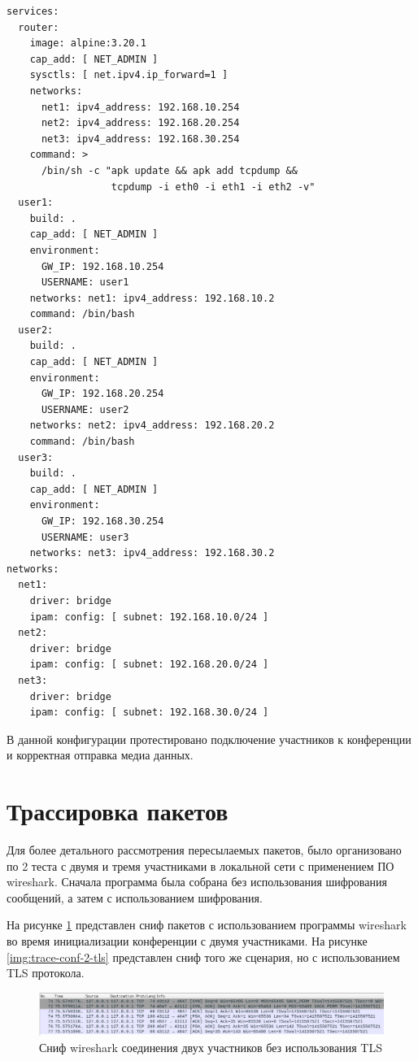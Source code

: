 {\fontsize{11pt}{9pt}\selectfont
\begin{verbatim}
services:
  router:
    image: alpine:3.20.1
    cap_add: [ NET_ADMIN ]
    sysctls: [ net.ipv4.ip_forward=1 ]
    networks:
      net1: ipv4_address: 192.168.10.254
      net2: ipv4_address: 192.168.20.254
      net3: ipv4_address: 192.168.30.254
    command: >
      /bin/sh -c "apk update && apk add tcpdump &&
                  tcpdump -i eth0 -i eth1 -i eth2 -v"
  user1:
    build: .
    cap_add: [ NET_ADMIN ]
    environment:
      GW_IP: 192.168.10.254
      USERNAME: user1
    networks: net1: ipv4_address: 192.168.10.2
    command: /bin/bash
  user2:
    build: .
    cap_add: [ NET_ADMIN ]
    environment:
      GW_IP: 192.168.20.254
      USERNAME: user2
    networks: net2: ipv4_address: 192.168.20.2
    command: /bin/bash
  user3:
    build: .
    cap_add: [ NET_ADMIN ]
    environment:
      GW_IP: 192.168.30.254
      USERNAME: user3
    networks: net3: ipv4_address: 192.168.30.2
networks:
  net1:
    driver: bridge
    ipam: config: [ subnet: 192.168.10.0/24 ]
  net2:
    driver: bridge
    ipam: config: [ subnet: 192.168.20.0/24 ]
  net3:
    driver: bridge
    ipam: config: [ subnet: 192.168.30.0/24 ]
\end{verbatim}}

В данной конфигурации протестировано подключение участников к конференции и корректная отправка медиа данных. 

\section{Трассировка пакетов}

Для более детального рассмотрения пересылаемых пакетов, было организовано по 2 теста с двумя и тремя участниками в локальной сети с применением ПО wireshark. Сначала программа была собрана без использования шифрования сообщений, а затем с использованием шифрования.

На рисунке \ref{img:trace-conf-2} представлен сниф пакетов с использованием программы wireshark во время инициализации конференции с двумя участниками.
На рисунке \ref{img:trace-conf-2-tls} представлен сниф того же сценария, но с использованием TLS протокола.

\begin{figure}[H]
  \centering
  \includegraphics[width=\linewidth]{inc/img/trace-conf-2.png}
  \caption{Сниф wireshark соединения двух участников без использования TLS}
  \label{img:trace-conf-2}
\end{figure}

